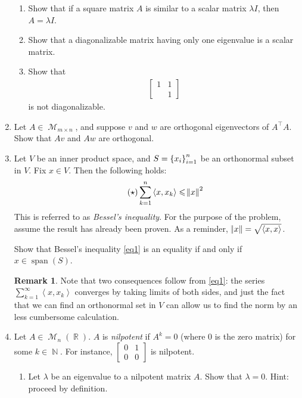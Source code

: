 \documentclass{amsart} %
\theoremstyle{mytheoremstyle}
\theoremstyle{definition}
\newtheorem*{rmk}{Remark}
\DeclareMathOperator{\N}{\mathbb{N}}
\DeclareMathOperator{\R}{\mathbb{R}}
\DeclareMathOperator{\1}{\mathbbm{1}}
\DeclareMathOperator{\MM}{\mathcal{M}}
\DeclareMathOperator{\Span}{span}
\renewcommand{\leq}{\leqslant}
\newcommand{\innerproduct}[2]{\left\langle #1,#2 \right\rangle}
\begin{document}
\begin{enumerate}[itemsep=1em]
	\begin{enumerate}
		\item Show that if a square matrix $A$ is similar to a scalar matrix $\lambda I$, then $A = \lambda I$.
		\item Show that a diagonalizable matrix having only one eigenvalue is a scalar matrix.
		\item Show that
		\begin{align*}
		\begin{bmatrix}
		1 & 1 \\ & 1
		\end{bmatrix}
		\end{align*}
		is not diagonalizable.
	\end{enumerate}

	\item Let $A \in \MM_{m \times n}$, and suppose $v$ and $w$ are orthogonal eigenvectors of $A^{\intercal}A$. Show that $Av$ and $Aw$ are orthogonal.
	
	\item Let $V$ be an inner product space, and $S = \set{x_i}_{i=1}^{n}$ be an orthonormal subset in $V$. Fix $x \in V$. Then the following holds:
	\begin{equation}
		\label{eq1}
		\tag{$\star$}
		\sum_{k=1}^{n} \innerproduct{x}{x_k} \leq \norm{x}^2
	\end{equation}
	This is referred to as \textit{Bessel's inequality}. For the purpose of the problem, assume the result has already been proven. As a reminder, $\norm{x} = \sqrt{\innerproduct{x}{x}}$.
	
	Show that Bessel's inequality \eqref{eq1} is an equality if and only if $x \in \Span(S)$.
	
	\begin{rmk}
		Note that two consequences follow from \eqref{eq1}: the series $\sum_{k=1}^{\infty} \innerproduct{x}{x_k}$ converges by taking limits of both sides, and just the fact that we can find an orthonormal set in $V$ can allow us to find the norm by an less cumbersome calculation.
	\end{rmk}

	
	\item Let $A \in \MM_{n}(\R)$. $A$ is \textit{nilpotent} if $A^k = 0$ (where $0$ is the zero matrix) for some $k \in \N$. For instance, $\begin{bmatrix}
	0 & 1 \\ 0 & 0 
	\end{bmatrix}$ is nilpotent.
	\begin{enumerate}
		\item Let $\lambda$ be an eigenvalue to a nilpotent matrix $A$. Show that $\lambda = 0$. Hint: proceed by definition.
		

\end{enumerate}
\end{enumerate}
\end{document}
